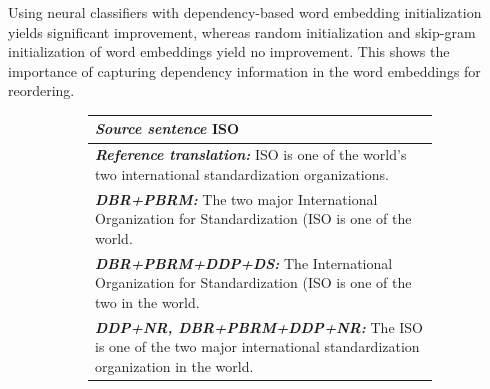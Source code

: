 \documentclass[letterpaper]{article}
\begin{document}
Using neural classifiers with dependency-based word embedding initialization yields significant improvement, whereas random initialization and skip-gram initialization of word embeddings yield no improvement. This shows the importance of capturing dependency information in the word embeddings for reordering.

\begin{CJK}{UTF8}{gbsn}
\begin{figure}
\begin{subfigure}[b]{0.36\textwidth}
\footnotesize
\begin{tabular}{|L{\textwidth}|}
\hline
{\bf \em Source sentence} \newline
ISO\hspace{0.1cm}\hspace{0.1cm}\hspace{0.1cm}\hspace{0.1cm}\hspace{0.1cm}\hspace{0.1cm}\hspace{0.1cm}\hspace{0.1cm}\hspace{0.1cm}\hspace{0.1cm}\hspace{0.1cm}\\
\hline
{\bf \em Reference translation:} \newline
ISO is one of the world's two international standardization organizations.\\
\hline
{\bf \em DBR+PBRM:}\newline
The two major International Organization for Standardization (ISO is one of the world.\\
\hline

{\bf \em DBR+PBRM+DDP+DS:}\newline
The International Organization for Standardization (ISO is one of the two in the world.\\
\hline

{\bf \em DDP+NR, DBR+PBRM+DDP+NR:}\newline
The ISO is one of the two major international standardization organization in the world. \\
\hline
\end{tabular}


\end{subfigure}
\end{figure}
\end{CJK}
\end{document}

